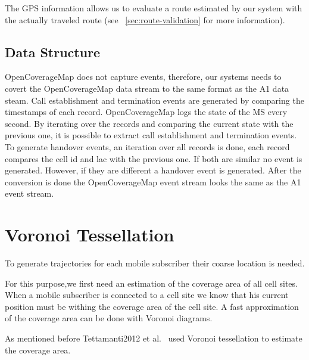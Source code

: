 \documentclass[master,english]{hgbthesis}
\begin{document}
The GPS information allows us to evaluate a route estimated by our system with the actually traveled route (see ~\ref{sec:route-validation} for more information).


\subsection{Data Structure}


OpenCoverageMap does not capture events, therefore, our systems needs to covert the OpenCoverageMap data stream to the same format as the A1 data steam. Call establishment and termination events are generated by comparing the timestamps of each record. OpenCoverageMap logs the state of the MS every second. By iterating over the records and comparing the current state with the previous one, it is possible to extract call establishment and termination events. To generate handover events, an iteration over all records is done, each record compares the cell id and lac with the previous one. If both are similar no event is generated. However, if they are different a handover event is generated. After the conversion is done the OpenCoverageMap event stream looks the same as the A1 event stream.  

\section{Voronoi Tessellation}

\label{sec:voronoites}

To generate trajectories for each mobile subscriber their coarse location is needed.

For this purpose,we first need an estimation of the coverage area of all cell sites. When a mobile subscriber is connected to a cell site we know that his current position must be withing the coverage area of the cell site. A fast approximation of the coverage area can be done with Voronoi diagrams.

As mentioned before Tettamanti2012 et al.\ \cite{Tettamanti2012} used Voronoi tessellation to estimate the coverage area.
\end{document}
